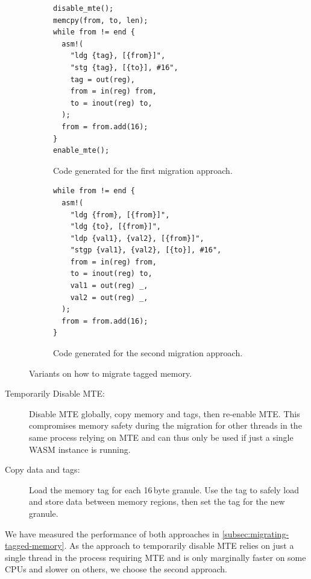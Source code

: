 \begin{figure}[h]
  \centering
  \begin{subfigure}[T]{0.45\textwidth}
    \centering
    \begin{lstlisting}[frame=h,style=customc,label={lst:migrating-memory-disable}]
disable_mte();
memcpy(from, to, len);
while from != end {
  asm!(
    "ldg {tag}, [{from}]",
    "stg {tag}, [{to}], #16",
    tag = out(reg),
    from = in(reg) from,
    to = inout(reg) to,
  );
  from = from.add(16);
}
enable_mte();
    \end{lstlisting}
    \caption{Code generated for the first migration approach.}
    \label{fig:migrating-memory-disable}
  \end{subfigure}
  \hfill
  \begin{subfigure}[T]{0.45\textwidth}
    \centering
    \begin{lstlisting}[frame=h,style=customc,label={lst:migrating-memory-tags}]
while from != end {
  asm!(
    "ldg {from}, [{from}]",
    "ldg {to}, [{from}]",
    "ldp {val1}, {val2}, [{from}]",
    "stgp {val1}, {val2}, [{to}], #16",
    from = in(reg) from,
    to = inout(reg) to,
    val1 = out(reg) _,
    val2 = out(reg) _,
  );
  from = from.add(16);
}
    \end{lstlisting}
    \caption{Code generated for the second migration approach.}
    \label{fig:migrating-memory-tags}
  \end{subfigure}
  \caption{Variants on how to migrate tagged memory.}
  \label{fig:migrating-memory}
\end{figure}

\begin{description}
  \item[Temporarily Disable \ac{MTE}:]
  Disable \ac{MTE} globally, copy memory and tags, then re-enable \ac{MTE}.
  This compromises memory safety during the migration for other threads in the same process relying on \ac{MTE} and can thus only be used if just a single \ac{WASM} instance is running.

  \item[Copy data and tags:]
  Load the memory tag for each 16\,byte granule.
  Use the tag to safely load and store data between memory regions, then set the tag for the new granule.

\end{description}

\noindent
We have measured the performance of both approaches in \cref{subsec:migrating-tagged-memory}.
As the approach to temporarily disable \ac{MTE} relies on just a single thread in the process requiring \ac{MTE} and is only marginally faster on some CPUs and slower on others, we choose the second approach.

